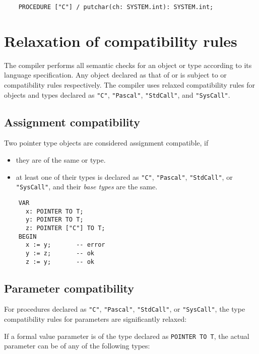 \verb'    PROCEDURE ["C"] / putchar(ch: SYSTEM.int): SYSTEM.int;'


\section{Relaxation of compatibility rules}
\label{multilang:relax}

The compiler performs all semantic checks for an object or type
according to its language specification. Any object declared as that
of \mt{} or \ot{} is subject to \mt{} or \ot{} compatibility rules
respectively.  The compiler uses relaxed compatibility rules for
objects and types declared as \verb'"C"', \verb'"Pascal"',
\verb'"StdCall"', and \verb'"SysCall"'.

\subsection{Assignment compatibility}

Two pointer type objects are considered assignment compatible, if

\begin{itemize}
\item they are of the same \mt{} or \ot{} type.
\item at least one of their types is declared as
      \verb'"C"', \verb'"Pascal"', \verb'"StdCall"', or \verb'"SysCall"',
      and their {\it base types} are the same.
\end{itemize}

\begin{verbatim}
    VAR
      x: POINTER TO T;
      y: POINTER TO T;
      z: POINTER ["C"] TO T;
    BEGIN
      x := y;       -- error
      y := z;       -- ok
      z := y;       -- ok
\end{verbatim}

\subsection{Parameter compatibility}
\label{multilang:parmcomp}

For procedures declared as \verb'"C"', \verb'"Pascal"',
\verb'"StdCall"', or \verb'"SysCall"', the
type compatibility rules for parameters are significantly relaxed:

If a formal value parameter is of the type declared as \verb'POINTER TO T',
the actual parameter can be of any of the following types:

